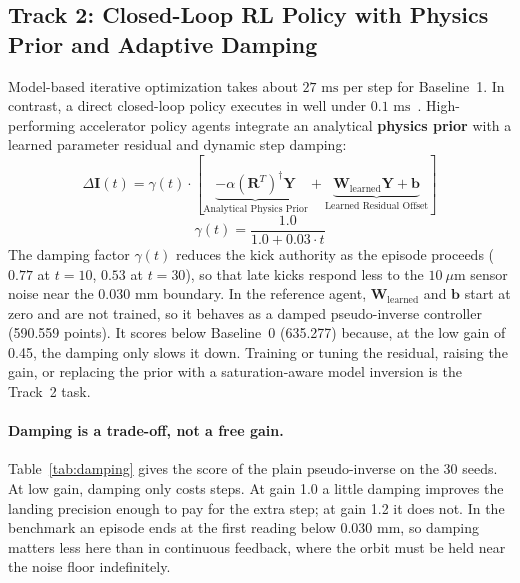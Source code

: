 \documentclass[11pt,a4paper]{article}
\begin{document}
\subsection{Track 2: Closed-Loop RL Policy with Physics Prior and Adaptive Damping}
Model-based iterative optimization takes about $27\text{ ms}$ per step for Baseline~1. In contrast, a direct closed-loop policy executes in well under $0.1\text{ ms}$~\cite{kain2020sample}.
High-performing accelerator policy agents integrate an analytical \textbf{physics prior} with a learned parameter residual and dynamic step damping:
\begin{equation}
    \Delta \mathbf{I}(t) = \gamma(t) \cdot \left[ \underbrace{- \alpha (\mathbf{R}^T)^\dagger \mathbf{Y}}_{\text{Analytical Physics Prior}} + \underbrace{\mathbf{W}_{\text{learned}}\mathbf{Y} + \mathbf{b}}_{\text{Learned Residual Offset}} \right]
\end{equation}
\begin{equation}
    \gamma(t) = \frac{1.0}{1.0 + 0.03 \cdot t}
\end{equation}
The damping factor $\gamma(t)$ reduces the kick authority as the episode proceeds ($0.77$ at $t = 10$, $0.53$ at $t = 30$), so that late kicks respond less to the $10\ \mu\text{m}$ sensor noise near the $0.030\text{ mm}$ boundary. In the reference agent, $\mathbf{W}_{\text{learned}}$ and $\mathbf{b}$ start at zero and are not trained, so it behaves as a damped pseudo-inverse controller (590.559 points). It scores below Baseline~0 (635.277) because, at the low gain of 0.45, the damping only slows it down. Training or tuning the residual, raising the gain, or replacing the prior with a saturation-aware model inversion is the Track~2 task.

\paragraph{Damping is a trade-off, not a free gain.} Table~\ref{tab:damping} gives the score of the plain pseudo-inverse on the 30 seeds. At low gain, damping only costs steps. At gain 1.0 a little damping improves the landing precision enough to pay for the extra step; at gain 1.2 it does not. In the benchmark an episode ends at the first reading below $0.030\text{ mm}$, so damping matters less here than in continuous feedback, where the orbit must be held near the noise floor indefinitely.
\end{document}
